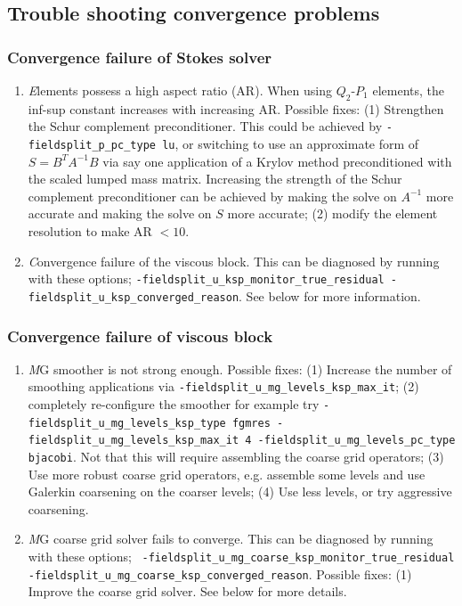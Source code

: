 \documentclass[paper=a4, fontsize=11pt,twoside]{scrartcl}
\newcommand{\unix}[1]{\texttt{\footnotesize #1}}
\begin{document}
{{\subsection{Trouble shooting convergence problems}

\subsubsection*{Convergence failure of Stokes solver}
\begin{enumerate}
	\item {\textit Elements possess a high aspect ratio (AR)}. When using $Q_2$-$P_1$ elements, the inf-sup constant increases with increasing AR. Possible fixes: (1) Strengthen the Schur complement preconditioner. This could be achieved by \unix{-fieldsplit\_p\_pc\_type lu}, or switching to use an approximate form  of $S = B^T A^{-1} B$ via say one application of a Krylov method preconditioned with the scaled lumped mass matrix. Increasing the strength of the Schur complement preconditioner can be achieved by making the solve on $A^{-1}$ more accurate and making the solve on $S$ more accurate; (2) modify the element resolution to make AR $< 10$.
	\item {\textit Convergence failure of the viscous block}. This can be diagnosed by running with these options; \unix{-fieldsplit\_u\_ksp\_monitor\_true\_residual -fieldsplit\_u\_ksp\_converged\_reason}. See below for more information.
\end{enumerate}


\subsubsection*{Convergence failure of viscous block}
\begin{enumerate}
	\item {\textit MG smoother is not strong enough}. Possible fixes: 
	(1) Increase the number of smoothing applications via \unix{-fieldsplit\_u\_mg\_levels\_ksp\_max\_it}; 
	(2) completely re-configure the smoother for example try \unix{-fieldsplit\_u\_mg\_levels\_ksp\_type fgmres -fieldsplit\_u\_mg\_levels\_ksp\_max\_it 4 -fieldsplit\_u\_mg\_levels\_pc\_type bjacobi}. Not that this will require assembling the coarse grid operators; 
	(3) Use more robust coarse grid operators, e.g. assemble some levels and use Galerkin coarsening on the coarser levels;
	(4) Use less levels, or try aggressive coarsening.
	\item {\textit MG coarse grid solver fails to converge}. 
	This can be diagnosed by running with these options; \
	\unix{-fieldsplit\_u\_mg\_coarse\_ksp\_monitor\_true\_residual -fieldsplit\_u\_mg\_coarse\_ksp\_converged\_reason}.
	Possible fixes: (1) Improve the coarse grid solver. See below for more details.
\end{enumerate}


}}
\end{document}

